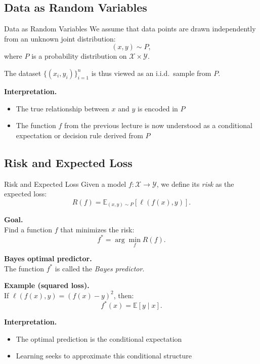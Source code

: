 \documentclass[aspectratio=169,11pt]{beamer}
\begin{document}
\subsection{Data as Random Variables}
\begin{frame}[t,allowframebreaks]{Data as Random Variables}
\small
We assume that data points are drawn independently from an unknown joint distribution:
\[
(x, y) \sim P,
\]
where $P$ is a probability distribution on $\mathcal{X} \times \mathcal{Y}$.

The dataset $\{(x_i, y_i)\}_{i=1}^n$ is thus viewed as an i.i.d.\ sample from $P$.

\textbf{Interpretation.}\\ \begin{itemize}
    \item The true relationship between $x$ and $y$ is encoded in $P$
    \item The function $f$ from the previous lecture is now understood as a conditional expectation or decision rule derived from $P$
\end{itemize}
\end{frame}

\subsection{Risk and Expected Loss}
\begin{frame}[t,allowframebreaks]{Risk and Expected Loss}
\small
Given a model $f : \mathcal{X} \to \mathcal{Y}$, we define its \emph{risk} as the expected loss:
\[
R(f) = \mathbb{E}_{(x,y) \sim P} \left[ \ell(f(x), y) \right].
\]

\textbf{Goal.}\\ Find a function $f$ that minimizes the risk:
\[
f^* = \arg\min_f R(f).
\]

\textbf{Bayes optimal predictor.}\\ The function $f^*$ is called the \emph{Bayes predictor}.

\textbf{Example (squared loss).}\\ If $\ell(f(x), y) = (f(x) - y)^2$, then:
\[
f^*(x) = \mathbb{E}[y \mid x].
\]

\textbf{Interpretation.}\\ \begin{itemize}
    \item The optimal prediction is the conditional expectation
    \item Learning seeks to approximate this conditional structure
\end{itemize}
\end{frame}
\end{document}
